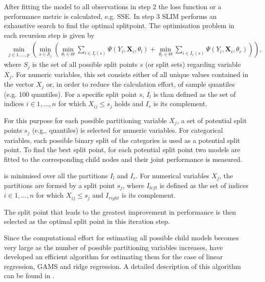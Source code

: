 After fitting the model to all observations in step 2 the loss function or a performance metric is calculated, e.g. SSE.
In step 3 SLIM performs an exhaustive search to find the optimal splitpoint.  
The optimisation problem in each recursion step is given by \begin{align}
    \min_{j \in 1,..., p} \left( \min_{s \in \mathcal{S}_j} \left(\min_{\theta_{l} \in \Theta}\sum_{i \in I_{l}(s)}\Psi(Y_{i}, \mathbf{X}_{i}, \theta_{l})  +  \min_{\theta_{r} \in \Theta}\sum_{i \in I_{r}(s)}\Psi(Y_{i}, \mathbf{X}_{i}, \theta_{r}) \right) \right),
\end{align}
where ${S}_j$ is the set of all possible split points $s$ (or split sets) regarding variable $X_j$. For numeric variables, this set consists either of all unique values contained in the vector $X_j$ or, in order to reduce the calculation effort, of sample quantiles (e.g. 100 quantiles). For a specific split point $s$, $I_{l}$ is than defined as the set of indices $i \in 1,...,n$ for which $X_{ij} \leq s_{j}$ holds and $I_{r}$ is its complement. 



For this purpose for each possible partitioning variable $X_j$, a set of potential split points $s_j$ (e.g., quantiles) is selected for numeric variables. For categorical variables, each possible binary split of the categories is used as a potential split point.
To find the best split point, for each potential split point two models are fitted to the corresponding child nodes and their joint performance is measured.

is minimised over all the partitions $I_{l}$ and $I_{r}$. 
For numerical variables $X_{j}$, the partitions are formed by a split point $s_{j}$, where $I_{left}$ is defined as the set of indices $i \in 1,...,n$ for which $X_{ij} \leq s_{j}$ and $I_{right}$ is its complement.



The split point that leads to the greatest improvement in performance is then selected as the optimal split point in this iteration step.

Since the computational effort for estimating all possible child models becomes very large as the number of possible partitioning variables increases, \citep{Hu.2020} have developed an efficient algorithm for estimating them for the case of linear regression, GAMS and ridge regression. A detailed description of this algorithm can be found in \citep{Hu.2020}.










